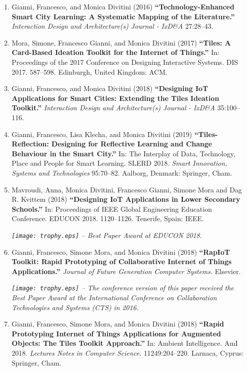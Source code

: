 \begin{enumerate}[label=\numberingI{\textbf{P\arabic*}}]
    \item Gianni, Francesco, and Monica Divitini (2016) \textbf{\enquote{Technology-Enhanced Smart City Learning: A Systematic Mapping of the Literature.}} \emph{Interaction Design and Architecture(s) Journal - IxD\&A} 27:28--43.
    \item Mora, Simone, Francesco Gianni, and Monica Divitini (2017) \textbf{\enquote{Tiles: A Card-Based Ideation Toolkit for the Internet of Things.}} In: Proceedings of the 2017 Conference on Designing Interactive Systems. DIS 2017. 587--598. Edinburgh, United Kingdom: ACM.
    \item Gianni, Francesco, and Monica Divitini (2018) \textbf{\enquote{Designing IoT Applications for Smart Cities: Extending the Tiles Ideation Toolkit.}} \emph{Interaction Design and Architecture(s) Journal - IxD\&A} 35:100--116.
    \item Gianni, Francesco, Lisa Klecha, and Monica Divitini (2019) \textbf{\enquote{Tiles-Reflection: Designing for Reflective Learning and Change Behaviour in the Smart City.}} In: The Interplay of Data, Technology, Place and People for Smart Learning. SLERD 2018. \emph{Smart Innovation, Systems and Technologies} 95:70--82. Aalborg, Denmark: Springer, Cham.
    \pagebreak
    \item Mavroudi, Anna, Monica Divitini, Francesco Gianni, Simone Mora and Dag R. Kvittem (2018) \textbf{\enquote{Designing IoT Applications in Lower Secondary Schools.}} In: Proceedings of IEEE Global Engineering Education Conference. EDUCON 2018. 1120--1126. Tenerife, Spain: IEEE.
    
    {\footnotesize \textit{\texttt{[image: trophy.eps]} -- Best Paper Award at EDUCON 2018.}}
    \item Gianni, Francesco, Simone Mora, and Monica Divitini (2018) \textbf{\enquote{RapIoT Toolkit: Rapid Prototyping of Collaborative Internet of Things Applications.}} \emph{Journal of Future Generation Computer Systems.} Elsevier.
    
    {\footnotesize \textit{\texttt{[image: trophy.eps]} -- The conference version of this paper received the Best Paper Award at the International Conference on Collaboration Technologies and Systems (CTS) in 2016.}}
    \item Gianni, Francesco, Simone Mora, and Monica Divitini (2018) \textbf{\enquote{Rapid Prototyping Internet of Things Applications for Augmented Objects: The Tiles Toolkit Approach.}} In: Ambient Intelligence. AmI 2018. \emph{Lectures Notes in Computer Science.} 11249:204--220. Larnaca, Cyprus: Springer, Cham.
\end{enumerate}

